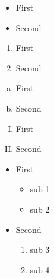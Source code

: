 \documentclass[a4paper, 12pt]{article}
\begin{document}
  \begin{itemize}
    \item First
    \item Second
  \end{itemize}
  

  \begin{enumerate}
    \item First
    \item Second
  \end{enumerate}
  

  \begin{enumerate}[(a)]
    \item First
    \item Second
  \end{enumerate}
  
  
  \begin{enumerate}[(I)]
    \item First
    \item Second
  \end{enumerate}
  
  \begin{itemize}
    \item First
    \begin{itemize}
      \item sub 1
      \item sub 2
  \end{itemize}
    \item Second
    \begin{enumerate}
      \item sub 3
      \item sub 4
  \end{enumerate}
  \end{itemize}
  
\end{document}
